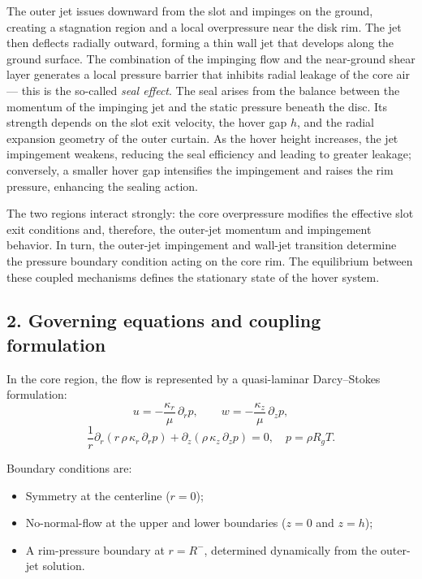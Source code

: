 \documentclass[11pt,a4paper]{article}
\begin{document}
The outer jet issues downward from the slot and impinges on the ground, creating a stagnation region and a local overpressure near the disk rim. The jet then deflects radially outward, forming a thin wall jet that develops along the ground surface. The combination of the impinging flow and the near-ground shear layer generates a local pressure barrier that inhibits radial leakage of the core air — this is the so-called \textit{seal effect}. The seal arises from the balance between the momentum of the impinging jet and the static pressure beneath the disc. Its strength depends on the slot exit velocity, the hover gap $h$, and the radial expansion geometry of the outer curtain. As the hover height increases, the jet impingement weakens, reducing the seal efficiency and leading to greater leakage; conversely, a smaller hover gap intensifies the impingement and raises the rim pressure, enhancing the sealing action.

The two regions interact strongly: the core overpressure modifies the effective slot exit conditions and, therefore, the outer-jet momentum and impingement behavior. In turn, the outer-jet impingement and wall-jet transition determine the pressure boundary condition acting on the core rim. The equilibrium between these coupled mechanisms defines the stationary state of the hover system.

\subsection*{2. Governing equations and coupling formulation}

In the core region, the flow is represented by a quasi-laminar Darcy–Stokes formulation:
\begin{equation}
u = -\frac{\kappa_r}{\mu}\,\partial_r p, 
\qquad
w = -\frac{\kappa_z}{\mu}\,\partial_z p,
\end{equation}
\begin{equation}
\frac{1}{r}\partial_r\left(r\,\rho\,\kappa_r\,\partial_r p\right)
+ \partial_z\left(\rho\,\kappa_z\,\partial_z p\right) = 0,
\quad p = \rho R_g T.
\end{equation}

Boundary conditions are:
\begin{itemize}
  \item Symmetry at the centerline ($r = 0$);
  \item No-normal-flow at the upper and lower boundaries ($z = 0$ and $z = h$);
  \item A rim-pressure boundary at $r = R^-$, determined dynamically from the outer-jet solution.
\end{itemize}
\end{document}
